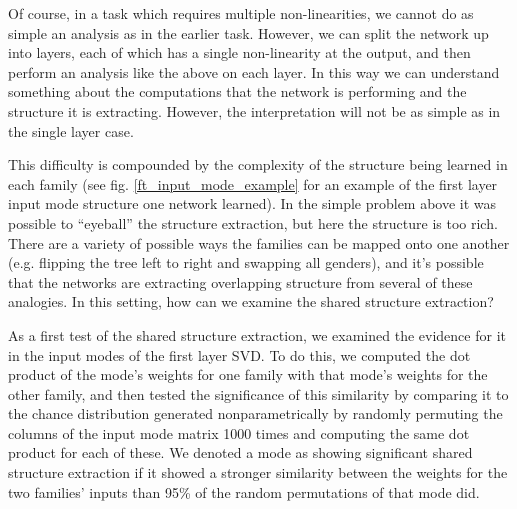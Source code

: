 \documentclass[10pt,letterpaper]{article}
\begin{document}
Of course, in a task which requires multiple non-linearities, we cannot do as simple an analysis as in the earlier task. However, we can split the network up into layers, each of which has a single non-linearity at the output, and then perform an analysis like the above on each layer. In this way we can understand something about the computations that the network is performing and the structure it is extracting. However, the interpretation will not be as simple as in the single layer case. \par
This difficulty is compounded by the complexity of the structure being learned in each family (see fig. \ref{ft_input_mode_example} for an example of the first layer input mode structure one network learned). In the simple problem above it was possible to ``eyeball'' the structure extraction, but here the structure is too rich. There are a variety of possible ways the families can be mapped onto one another (e.g. flipping the tree left to right and swapping all genders), and it's possible that the networks are extracting overlapping structure from several of these analogies. In this setting, how can we examine the shared structure extraction? \par
As a first test of the shared structure extraction, we examined the evidence for it in the input modes of the first layer SVD. To do this, we computed the dot product of the mode's weights for one family with that mode's weights for the other family, and then tested the significance of this similarity by comparing it to the chance distribution generated nonparametrically by randomly permuting the columns of the input mode matrix 1000 times and computing the same dot product for each of these. We denoted a mode as showing significant shared structure extraction if it showed a stronger similarity between the weights for the two families' inputs than 95\% of the random permutations of that mode did. \par
\end{document}
